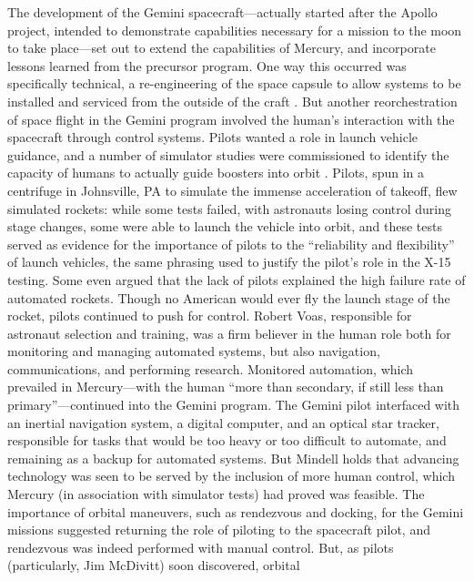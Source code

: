 The development of the Gemini spacecraft---actually started after the
Apollo project, intended to demonstrate capabilities necessary for
a mission to the moon to take place---set out to extend the
capabilities of Mercury, and incorporate lessons learned from the
precursor program. One way this occurred was specifically technical, a
re-engineering of the space capsule to allow systems to be installed
and serviced from the outside of the craft \cite{???}. But another
reorchestration of space flight in the Gemini program involved the
human's interaction with the spacecraft through control systems.
Pilots wanted a role in launch vehicle guidance, and a number of
simulator studies were commissioned to identify the capacity of humans to
actually guide boosters into orbit \cite{???}. Pilots, spun in a
centrifuge in Johnsville, PA to simulate the immense acceleration of
takeoff, flew
simulated rockets: while some tests failed, with astronauts losing
control during stage changes, some were able to launch the vehicle
into orbit, and these tests served as evidence for the importance of
pilots to the ``reliability and flexibility'' of launch vehicles,
the same phrasing used to justify the pilot's role in the X-15
testing\cite[p. 72]{???-DM}. Some even argued that the lack of pilots
explained the high failure rate of automated rockets\cite[p.
  73]{???-DM}. Though no American would ever fly the launch stage of
the rocket, pilots continued to push for control. Robert Voas,
responsible for astronaut selection and training, was a firm believer
in the human role both for monitoring and managing automated systems,
but also 
navigation, communications, and performing research\cite[p.
  77]{???-DM}. Monitored automation, which prevailed in Mercury---with
the human ``more than secondary, if still less than primary''\cite[p.
  77]{???-DM}---continued into the Gemini program. The Gemini pilot
interfaced with an inertial navigation system, a digital computer, and
an optical star tracker, responsible for tasks that would be too heavy
or too difficult to automate, and remaining as a backup for automated
systems\cite[p. 83]{???-DM}. But Mindell holds that advancing
technology was seen to be served by the inclusion of more human
control, which Mercury (in association with simulator tests) had proved was
feasible\cite[p. 84]{???-DM}. The importance of orbital maneuvers,
 such as rendezvous and docking, for the Gemini missions suggested returning
the role of piloting to the spacecraft pilot, and rendezvous was
indeed performed with manual control\cite[p. 84]{???-DM}. But, as
pilots (particularly, Jim McDivitt) soon discovered, orbital
